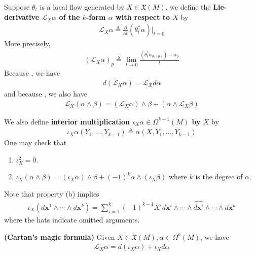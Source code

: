 \documentclass{report}
\begin{document}
\begin{mdframed}
Suppose $\theta_t$ is a local flow generated by $X \in \mathfrak{X}(M)$, we define the \textbf{Lie-derivative $\mathcal{L}_X \alpha $ of the $k$-form  $\alpha $ with respect to $X$} by 
\begin{align*}
\mathcal{L}_X \alpha \triangleq \frac{\partial }{\partial t} (\theta_t^* \alpha )\Big|_{t=0}
\end{align*}
More precisely, 
\begin{align*}
  (\mathcal{L}_X \alpha)_p \triangleq  \lim_{t\to 0} \frac{(\theta_t ^{*}\alpha_{\theta_t (p)}) -\alpha_p }{t} 
\end{align*}
Because , we have 
\begin{align*}
d(\mathcal{L}_X \alpha )= \mathcal{L}_X d\alpha 
\end{align*}
and because , we also have 
\begin{align*}
\mathcal{L}_X (\alpha \wedge  \beta  )= (\mathcal{L}_X \alpha )\wedge  \beta + (\alpha \wedge  \mathcal{L}_X \beta  ) 
\end{align*}


We also define \textbf{interior multiplication  $\iota_X \alpha \in \Omega^{k-1}(M)$ by $X$} by 
\begin{align*}
\iota_X \alpha (Y_1,\dots ,Y_{k-1})\triangleq \alpha (X,Y_1,\dots ,Y_{k-1})
\end{align*}
One may check that 
\begin{enumerate}[label=(\alph*)]
  \item $\iota_X^2=0 $.
  \item $\iota_X (\alpha \wedge  \beta  )=(\iota_X \alpha   )\wedge  \beta + (-1)^k \alpha \wedge  (\iota_X \beta   )$ where $k$ is the degree of  $\alpha$. 
\end{enumerate}
Note that property (b) implies 
\begin{align*}
\iota_X (d\textbf{x}^1\wedge  \cdots \wedge  d\textbf{x}^k)=\sum_{i=1}^k (-1)^{k-1}X^i d\textbf{x}^i \wedge \cdots \wedge  \widehat{d\textbf{x}^i} \wedge \cdots \wedge  d\textbf{x}^k      
\end{align*}
where the hats indicate omitted arguments.   
\end{mdframed}
\begin{theorem}
\textbf{(Cartan's magic formula)} Given $X \in \mathfrak{X}(M),\alpha  \in \Omega^k(M)$, we have 
\begin{align*}
\mathcal{L}_X\alpha = d(\iota_X \alpha  )+ \iota_X d \alpha 
\end{align*}
\end{theorem}
\end{document}
